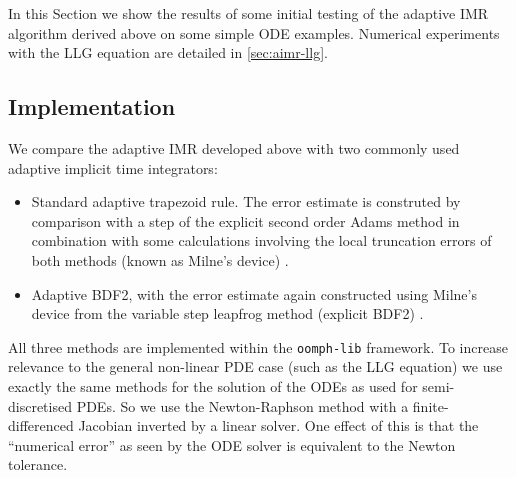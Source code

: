 
In this Section we show the results of some initial testing of the adaptive IMR algorithm derived above on some simple ODE examples.
Numerical experiments with the LLG equation are detailed in \autoref{sec:aimr-llg}.


\subsection{Implementation}
\label{sec:aimr-implementation}

We compare the adaptive IMR developed above with two commonly used adaptive implicit time integrators:
\begin{itemize}
\item Standard adaptive trapezoid rule. 
  The error estimate is construted by comparison with a step of the explicit second order Adams method in combination with some calculations involving the local truncation errors of both methods (known as Milne's device) \cite[pg. 707]{GreshoSani}.
\item Adaptive BDF2, with the error estimate again constructed using Milne's device from the variable step leapfrog method (\ie explicit BDF2) \cite[pg. 715]{GreshoSani}.
\end{itemize}

All three methods are implemented within the \texttt{oomph-lib} framework.
To increase relevance to the general non-linear PDE case (such as the LLG equation) we use exactly the same methods for the solution of the ODEs as used for semi-discretised PDEs.
So we use the Newton-Raphson method with a finite-differenced Jacobian inverted by a linear solver.
One effect of this is that the ``numerical error'' as seen by the ODE solver is equivalent to the Newton tolerance.

